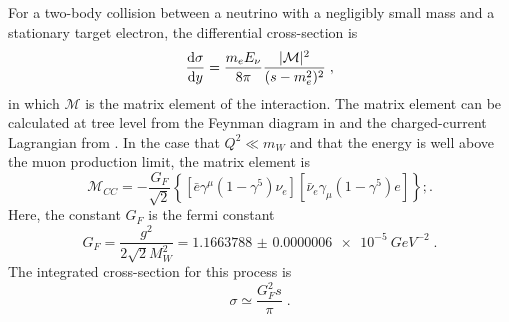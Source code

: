 For a two-body collision between a neutrino with a negligibly small mass and a stationary target electron, the differential cross-section is
\begin{equation}
    \frac{\mathrm{d} \sigma}{\mathrm{d} y} = \frac{m_e E_\nu}{8\pi}\frac{|\mathcal{M}|^2}{(s-m_e^2)^2}\;,
\end{equation}
in which $\mathcal{M}$ is the matrix element of the interaction. The matrix element can be calculated at tree level from the Feynman diagram in  and the charged-current Lagrangian from . In the case that $Q^2 \ll m_W$ and that the energy is well above the muon production limit, the matrix element is
\begin{equation}
    \mathcal{M}_{CC} = -\frac{G_F}{\sqrt{2}}\left\{ [\bar{e}\gamma^\mu(1-\gamma^5)\nu_e][\bar{\nu}_e\gamma_\mu(1-\gamma^5)e] \right\};.
\end{equation}
Here, the constant $G_F$ is the fermi constant
\begin{equation}
    G_F = \frac{g^2}{2\sqrt{2}M_W^2} = \SI{1.1663788(6)e-5}{GeV^{-2}}\;.
\end{equation}
The integrated cross-section for this process is 
\begin{equation}
    \sigma \simeq \frac{G^2_F s}{\pi}\;.
\end{equation}

